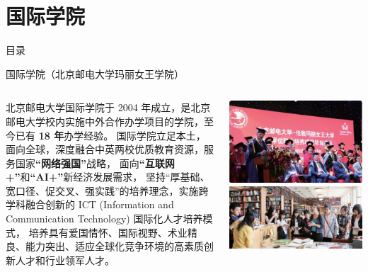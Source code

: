 \documentclass[aspectratio=169, utf8]{beamer}
\begin{document}
\section{国际学院}

\begin{frame}{目录}
    \begin{multicols}{2}
        \tableofcontents[currentsection]
    \end{multicols}
\end{frame}

\begin{frame}{国际学院（北京邮电大学玛丽女王学院）}
    \begin{columns}
        \small
        \setlength{\parindent}{2em}

        北京邮电大学国际学院于 2004 年成立，是北京邮电大学校内实施中外合作办学项目的学院，至今已有 \textcolor{Fore}{\textbf{18 年}}办学经验。
        国际学院立足本土，面向全球，深度融合中英两校优质教育资源，服务国家\textcolor{Fore}{\textbf{“网络强国”}}战略，
        面向\textcolor{Fore}{\textbf{“互联网+”}}和\textcolor{Fore}{\textbf{“AI+”}}新经济发展需求，
        坚持“厚基础、宽口径、促交叉、强实践”的培养理念，实施跨学科融合创新的 ICT (Information and Communication Technology) 国际化人才培养模式，
        培养具有爱国情怀、国际视野、术业精良、能力突出、适应全球化竞争环境的高素质创新人才和行业领军人才。

        \centering
        \includegraphics[width=\textwidth]{./resources/10.png}
        \includegraphics[width=\textwidth]{./resources/11.png}
    \end{columns}
\end{frame}
\end{document}
